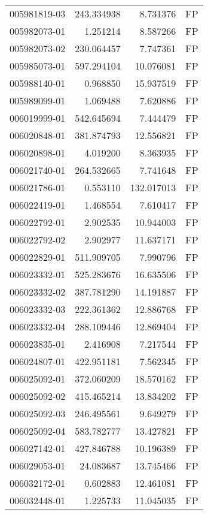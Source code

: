 \begin{tabular}{lrrl}
005981819-03 &  243.334938 &     8.731376 &   FP \\
005982073-01 &    1.251214 &     8.587266 &   FP \\
005982073-02 &  230.064457 &     7.747361 &   FP \\
005985073-01 &  597.294104 &    10.076081 &   FP \\
005988140-01 &    0.968850 &    15.937519 &   FP \\
005989099-01 &    1.069488 &     7.620886 &   FP \\
006019999-01 &  542.645694 &     7.444479 &   FP \\
006020848-01 &  381.874793 &    12.556821 &   FP \\
006020898-01 &    4.019200 &     8.363935 &   FP \\
006021740-01 &  264.532665 &     7.741648 &   FP \\
006021786-01 &    0.553110 &   132.017013 &   FP \\
006022419-01 &    1.468554 &     7.610417 &   FP \\
006022792-01 &    2.902535 &    10.944003 &   FP \\
006022792-02 &    2.902977 &    11.637171 &   FP \\
006022829-01 &  511.909705 &     7.990796 &   FP \\
006023332-01 &  525.283676 &    16.635506 &   FP \\
006023332-02 &  387.781290 &    14.191887 &   FP \\
006023332-03 &  222.361362 &    12.886768 &   FP \\
006023332-04 &  288.109446 &    12.869404 &   FP \\
006023835-01 &    2.416908 &     7.217544 &   FP \\
006024807-01 &  422.951181 &     7.562345 &   FP \\
006025092-01 &  372.060209 &    18.570162 &   FP \\
006025092-02 &  415.465214 &    13.834202 &   FP \\
006025092-03 &  246.495561 &     9.649279 &   FP \\
006025092-04 &  583.782777 &    13.427821 &   FP \\
006027142-01 &  427.846788 &    10.196389 &   FP \\
006029053-01 &   24.083687 &    13.745466 &   FP \\
006032172-01 &    0.602883 &    12.461081 &   FP \\
006032448-01 &    1.225733 &    11.045035 &   FP \\

\end{tabular}

